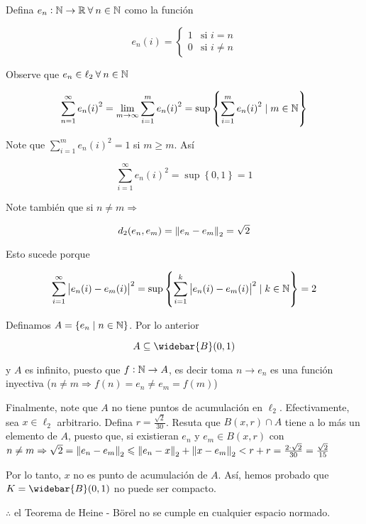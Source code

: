 \begin{proofexplanation}
    Defina $e_n : \mathbb{N} \to \mathbb{R} \: \forall \: n \in \mathbb{N}$ como la función

    $$ e_n(i) = \begin{cases}
              1 & \text{si }  i = n\\
              0 & \text{si } i \neq n
     \end{cases}$$

     Observe que $e_n \in \ell_2 \: \forall \: n \in \mathbb{N}$

     $$ \sum_{n=1}^{\infty} e_n{(i)}^{2} = \lim_{m \to \infty} \sum_{i=1}^{m} e_n{(i)}^{2} = \sup \left\{ \sum_{i=1}^{m} e_n{(i)}^{2} \mid m \in \N \right\}  $$

     Note que $\sum_{i=1}^{m} e_n{(i)}^{2} = 1$ si $ m \geqslant m$. Así

     $$\sum_{i=1}^{\infty} e_n{(i)}^{2} = \sup \left\{ 0, 1 \right\} = 1$$

     Note también que si $n \neq m \Rightarrow$

     $$d_2(e_n,e_m) = \norm{e_n-e_m}_2 = \sqrt{2}$$

     Esto sucede porque

     $$\sum_{i=1}^{\infty} {\abs{e_n(i)-e_m(i)}}^{2} = \sup \left\{ \sum_{i=1}^{k} {\abs{e_n(i)-e_m(i)}}^{2} \mid k \in \mathbb{N} \right\} = 2 $$

     Definamos $A = \{ e_n \mid n \in \mathbb{N} \}$. Por lo anterior

     $$A \subseteq \widebar{B}(0,1)$$

     y $A$ es infinito, puesto que $f : \mathbb{N} \to A$, es decir toma $n \to e_n$ es una función inyectiva ($n \neq m \Rightarrow f(n) = e_n \neq e_m = f(m)$)

     Finalmente, note que $A$ no tiene puntos de acumulación en $\ell_2$. Efectivamente, sea $x \in \ell_2$ arbitrario. Defina $r = \frac{\sqrt{2}}{30}$. Resuta que $B(x,r) \cap A$ tiene a lo más un elemento de $A$, puesto que, si existieran $e_n$ y $e_m \in B(x,r)$ con $n \neq m \Rightarrow \sqrt{2} = \norm{e_n-e_m}_2 \leqslant \norm{e_n-x}_2 + \norm{x-e_m}_2 < r + r = \frac{2 \cdot \sqrt{2}}{30} = \frac{\sqrt{2}}{15}$

     Por lo tanto, $x$ no es punto de acumulación de $A$. Así, hemos probado que $K = \widebar{B}(0,1)$ no puede ser compacto.

     $\therefore$ el Teorema de Heine - Börel no se cumple en cualquier espacio normado.
\end{proofexplanation}

